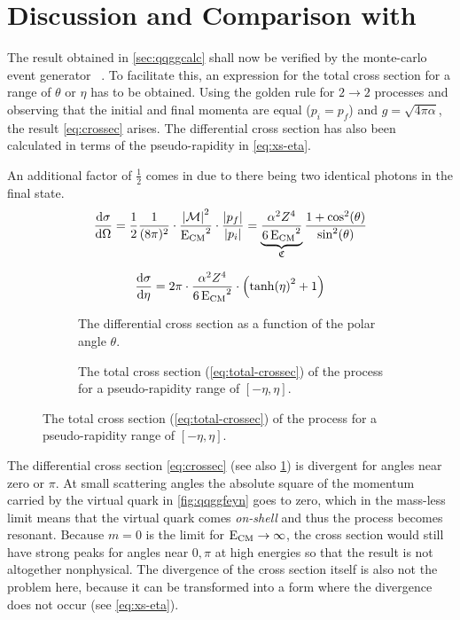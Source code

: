 \section{Discussion and Comparison with \sherpa}%
\label{sec:compsher}

The result obtained in \cref{sec:qqggcalc} shall now be verified by the
monte-carlo event generator \sherpa{}~\cite{Gleisberg:2008ta}. To
facilitate this, an expression for the total cross section for a range
of \(\theta\) or \(\eta\) has to be obtained. Using the golden rule
for \(2\rightarrow 2\) processes and observing that the initial and
final momenta are equal (\(p_i=p_f\)) and \(g=\sqrt{4\pi\alpha}\), the
result \cref{eq:crossec} arises. The differential cross section has
also been calculated in terms of the pseudo-rapidity
in \cref{eq:xs-eta}.

An additional factor of \(\frac{1}{2}\) comes in due to there being
two identical photons in the final state.
\begin{equation}
  \label{eq:crossec}
  \dv{\sigma}{\Omega} =
  \frac{1}{2}\frac{1}{(8\pi)^2}\cdot\frac{\abs{\mathcal{M}}^2}{\operatorname{E_{\text{CM}}}^2}\cdot\frac{\abs{p_f}}{\abs{p_i}}
  = \underbrace{\frac{\alpha^2Z^4}{6\operatorname{E_{\text{CM}}}^2}}_{\mathfrak{C}}\frac{1+\cos^2(\theta)}{\sin^2(\theta)}
\end{equation}

\begin{equation}
  \label{eq:xs-eta}
  \dv{\sigma}{\eta} = 2\pi\cdot\frac{\alpha^2Z^4}{6\operatorname{E_{\text{CM}}}^2}\cdot\qty(\tanh(\eta)^2 + 1)
\end{equation}

\begin{figure}[ht]
  \centering
  \begin{subfigure}[c]{.45\textwidth}
    \centering {}
    \caption[Plot of the differential cross section of the \(\qqgg\)
    process.]{\label{fig:diffxs} The differential cross section as a
      function of the polar angle \(\theta\). }
  \end{subfigure}
  \begin{subfigure}[c]{.45\textwidth}
  \centering
  \caption[Plot of the total cross section of the \(\qqgg\)
  process.]{\label{fig:totxs} The total cross section
    (\cref{eq:total-crossec}) of the process for a pseudo-rapidity
    range of \([-\eta, \eta]\).}
  \end{subfigure}
\end{figure}

The differential cross section \cref{eq:crossec} (see also
\cref{fig:diffxs}) is divergent for angles near zero or \(\pi\). At
small scattering angles the absolute square of the momentum carried by
the virtual quark in \cref{fig:qqggfeyn} goes to zero, which in the
mass-less limit means that the virtual quark comes \emph{on-shell} and
thus the process becomes resonant.  Because \(m=0\) is the limit for
\(\operatorname{E_{\text{CM}}}\rightarrow\infty\), the cross section would still have strong
peaks for angles near \(0,\pi\) at high energies so that the result is
not altogether nonphysical. The divergence of the cross section itself
is also not the problem here, because it can be transformed into a
form where the divergence does not occur (see \cref{eq:xs-eta}).

